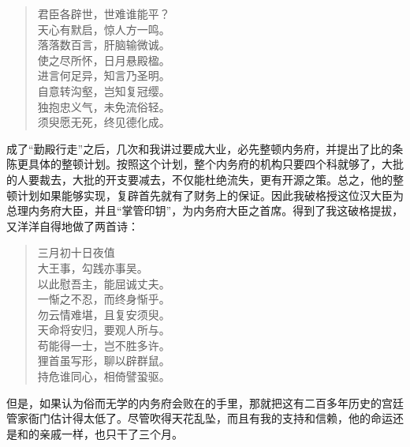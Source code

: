\begin{quote}
	君臣各辟世，世难谁能平？\\

天心有默启，惊人方一鸣。\\

落落数百言，肝脑输微诚。\\

使之尽所怀，日月悬殿楹。\\

进言何足异，知言乃圣明。\\

自意转沟壑，岂知复冠缨。\\

独抱忠义气，未免流俗轻。\\

须臾愿无死，终见德化成。\\
\end{quote}

成了“勤殿行走”之后，几次和我讲过要成大业，必先整顿内务府，并提出了比的条陈更具体的整顿计划。按照这个计划，整个内务府的机构只要四个科就够了，大批的人要裁去，大批的开支要减去，不仅能杜绝流失，更有开源之策。总之，他的整顿计划如果能够实现，复辟首先就有了财务上的保证。因此我破格授这位汉大臣为总理内务府大臣，并且“掌管印钥”，为内务府大臣之首席。得到了我这破格提拔，又洋洋自得地做了两首诗：\\

\begin{quote}
	三月初十日夜值\\

大王事，勾践亦事吴。\\

以此慰吾主，能屈诚丈夫。\\

一惭之不忍，而终身惭乎。\\

勿云情难堪，且复安须臾。\\

天命将安归，要观人所与。\\

苟能得一士，岂不胜多许。\\

狸首虽写形，聊以辟群鼠。\\

持危谁同心，相倚譬蛩驱。\\
\end{quote}

但是，如果认为俗而无学的内务府会败在的手里，那就把这有二百多年历史的宫廷管家衙门估计得太低了。尽管吹得天花乱坠，而且有我的支持和信赖，他的命运还是和的亲戚一样，也只干了三个月。\\

